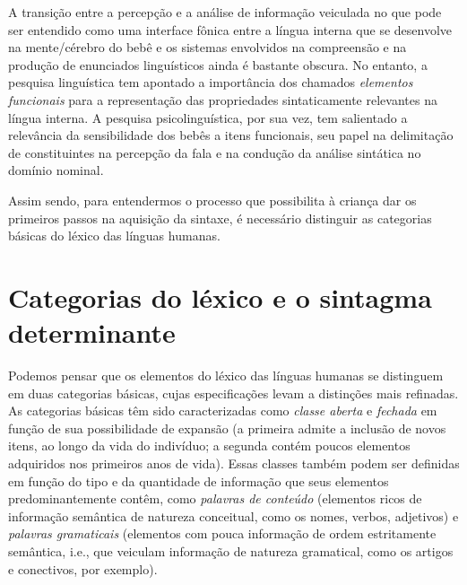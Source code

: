 \documentclass[output=paper]{LSP/langsci}
\begin{document}
A transição entre a percepção e a análise de informação veiculada no que pode ser entendido como uma interface fônica entre a língua interna que se desenvolve na mente/cérebro do bebê e os sistemas envolvidos na compreensão e na produção de enunciados linguísticos ainda é bastante obscura. No entanto, a pesquisa linguística tem apontado a importância dos chamados \textit{elementos funcionais} para a representação das propriedades sintaticamente relevantes na língua interna. A pesquisa psicolinguística, por sua vez, tem salientado a relevância da sensibilidade dos bebês a itens funcionais, seu papel na delimitação de constituintes na percepção da fala e na condução da análise sintática no domínio nominal. 

Assim sendo, para entendermos o processo que possibilita à criança dar os primeiros passos na aquisição da sintaxe, é necessário distinguir as categorias básicas do léxico das línguas humanas.  

\section{Categorias do léxico e o sintagma determinante}
Podemos pensar que os elementos do léxico das línguas humanas se distinguem em duas categorias básicas, cujas especificações levam a distinções mais refinadas. As categorias básicas têm sido caracterizadas como \textit{classe aberta} e \textit{fechada} em função de sua possibilidade de expansão (a primeira admite a inclusão de novos itens, ao longo da vida do indivíduo; a segunda contém poucos elementos adquiridos nos primeiros anos de vida). Essas classes também podem ser definidas em função do tipo e da quantidade de informação que seus elementos predominantemente contêm, como \textit{palavras de conteúdo} (elementos ricos de informação semântica de natureza conceitual, como os nomes, verbos, adjetivos) e \textit{palavras gramaticais} (elementos com pouca informação de ordem estritamente semântica, i.e., que veiculam informação de natureza gramatical, como os artigos e conectivos, por exemplo). 
\end{document}
